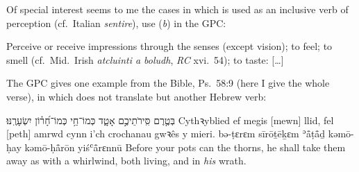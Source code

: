 \begin{enumerate}[A.]
		Of special interest seems to me the cases in which  is used as an inclusive verb of perception (cf.\ Italian \textit{sentire}), use (\textit{b}) in the GPC:
		\begin{changemargin}{1cm}{0cm}
			\begin{bilingquote}
				\transline
				{}
				{Perceive or receive impressions through the senses (except vision); to feel; to smell (cf.\ Mid.~Irish \textit{atcluinti a boludh}, \textit{RC} xvi.~54); to taste: […]}
			\end{bilingquote}
		\end{changemargin}
		\vspace{-0.5cm}
		The GPC gives one example from the Bible, Ps.~58:9 (here I give the whole verse), in which  does not translate  but another Hebrew verb:
		\begin{changemargin}{1cm}{0cm}
			\begin{bilingquote}
				\quoling
				{בְּטֶ֤רֶם  סִּֽירֹתֵיכֶ֣ם אָטָ֑ד כְּמוֹ־חַ֥י כְּמוֹ־חָ֝ר֗וֹן יִשְׂעָרֶֽנּוּ׃}
				{Cythꝛyblied ef megis [mewn] llid, fel [peth] amrwd cynn i’ch crochanau  gwꝛês y mieri.}
				{bə-ṭɛrɛm  sīrōṯēḵɛm ʾå̄ṭå̄ḏ kəmō-ḥay kəmō-ḥå̄rōn yiśʿå̄rɛnnū}
				{Before your pots can  the thorns, he shall take them away as with a whirlwind, both living, and in \textit{his} wrath.}
			\end{bilingquote}
		\end{changemargin}
		\vspace{-0.5cm}
\end{enumerate}
